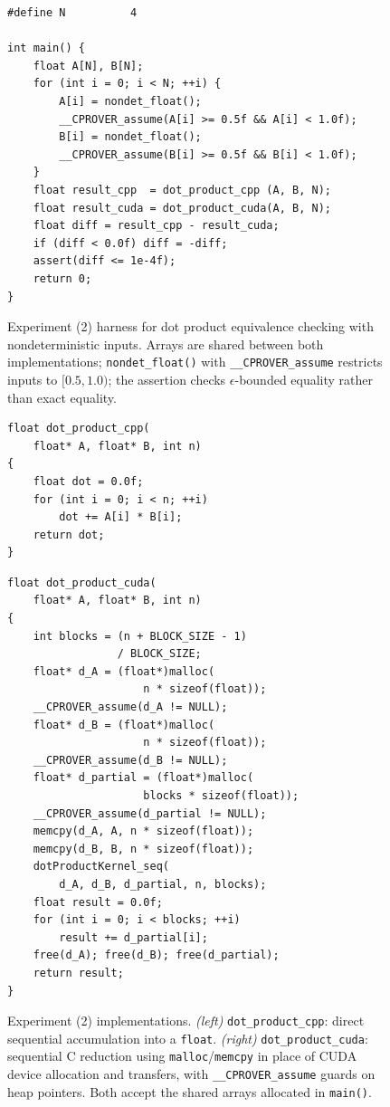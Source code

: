 \documentclass{article}
\begin{document}
\begin{figure}[H]
\begin{verbatim}
#define N          4

int main() {
    float A[N], B[N];
    for (int i = 0; i < N; ++i) {
        A[i] = nondet_float();
        __CPROVER_assume(A[i] >= 0.5f && A[i] < 1.0f);
        B[i] = nondet_float();
        __CPROVER_assume(B[i] >= 0.5f && B[i] < 1.0f);
    }
    float result_cpp  = dot_product_cpp (A, B, N);
    float result_cuda = dot_product_cuda(A, B, N);
    float diff = result_cpp - result_cuda;
    if (diff < 0.0f) diff = -diff;
    assert(diff <= 1e-4f);
    return 0;
}
\end{verbatim}
\caption{Experiment (2) harness for dot product equivalence checking with nondeterministic inputs. Arrays are shared between both implementations; \texttt{nondet\_float()} with \texttt{\_\_CPROVER\_assume} restricts inputs to $[0.5, 1.0)$; the assertion checks $\epsilon$-bounded equality rather than exact equality.}
\label{fig:dotprod-nondet-main}
\end{figure}

\begin{figure}[H]
\begin{minipage}[t]{0.48\linewidth}
\begin{verbatim}
float dot_product_cpp(
    float* A, float* B, int n)
{
    float dot = 0.0f;
    for (int i = 0; i < n; ++i)
        dot += A[i] * B[i];
    return dot;
}
\end{verbatim}
\end{minipage}
\hfill
\begin{minipage}[t]{0.48\linewidth}
\begin{verbatim}
float dot_product_cuda(
    float* A, float* B, int n)
{
    int blocks = (n + BLOCK_SIZE - 1)
                 / BLOCK_SIZE;
    float* d_A = (float*)malloc(
                     n * sizeof(float));
    __CPROVER_assume(d_A != NULL);
    float* d_B = (float*)malloc(
                     n * sizeof(float));
    __CPROVER_assume(d_B != NULL);
    float* d_partial = (float*)malloc(
                     blocks * sizeof(float));
    __CPROVER_assume(d_partial != NULL);
    memcpy(d_A, A, n * sizeof(float));
    memcpy(d_B, B, n * sizeof(float));
    dotProductKernel_seq(
        d_A, d_B, d_partial, n, blocks);
    float result = 0.0f;
    for (int i = 0; i < blocks; ++i)
        result += d_partial[i];
    free(d_A); free(d_B); free(d_partial);
    return result;
}
\end{verbatim}
\end{minipage}
\caption{Experiment (2) implementations. \textit{(left)} \texttt{dot\_product\_cpp}: direct sequential accumulation into a \texttt{float}. \textit{(right)} \texttt{dot\_product\_cuda}: sequential C reduction using \texttt{malloc}/\texttt{memcpy} in place of CUDA device allocation and transfers, with \texttt{\_\_CPROVER\_assume} guards on heap pointers. Both accept the shared arrays allocated in \texttt{main()}.}
\label{fig:dotprod-nondet-pair}
\end{figure}
\end{document}
